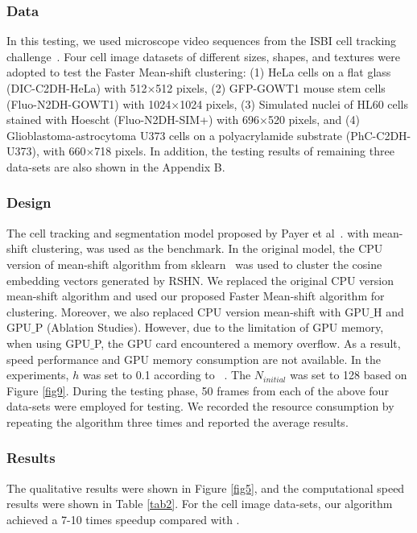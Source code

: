 \documentclass[journal,twoside,web]{ieeecolor}
\begin{document}
\subsubsection{Data}
In this testing, we used microscope video sequences from the ISBI cell tracking challenge~\cite{b20}. Four cell image datasets of different sizes, shapes, and textures were adopted to test the Faster Mean-shift clustering: (1) HeLa cells on a flat glass (DIC-C2DH-HeLa) with 512$\times$512 pixels, (2) GFP-GOWT1 mouse stem cells (Fluo-N2DH-GOWT1) with 1024$\times$1024 pixels, (3) Simulated nuclei of HL60 cells stained with Hoescht (Fluo-N2DH-SIM+) with 696$\times$520 pixels, and (4) Glioblastoma-astrocytoma U373 cells on a polyacrylamide substrate (PhC-C2DH-U373), with 660$\times$718 pixels. In addition, the testing results of remaining three data-sets are also shown in the Appendix B.

\subsubsection{Design}
The cell tracking and segmentation model proposed by Payer et al~\cite{b15}. with mean-shift clustering, was used as the benchmark. In the original model, the CPU version of mean-shift algorithm from sklearn~\cite{b33} was used to cluster the cosine embedding vectors generated by RSHN. We replaced the original CPU version mean-shift algorithm and used our proposed Faster Mean-shift algorithm for clustering. Moreover, we also replaced CPU version mean-shift with GPU$\_$H and GPU$\_$P (Ablation Studies). However, due to the limitation of GPU memory, when using GPU$\_$P, the GPU card encountered a memory overflow. As a result, speed performance and GPU memory consumption are not available. In the experiments, $h$ was set to 0.1 according to ~\cite{b15}. The $N_{initial}$ was set to 128 based on Figure \ref{fig9}. During the testing phase, 50 frames from each of the above four data-sets were employed for testing. We recorded the resource consumption by repeating the algorithm three times and reported the average results. 

\subsubsection{Results}
The qualitative results were shown in Figure \ref{fig5}, and the computational speed results were shown in Table \ref{tab2}. For the cell image data-sets, our algorithm achieved a 7-10 times speedup compared with \cite{b15}. 
\end{document}
